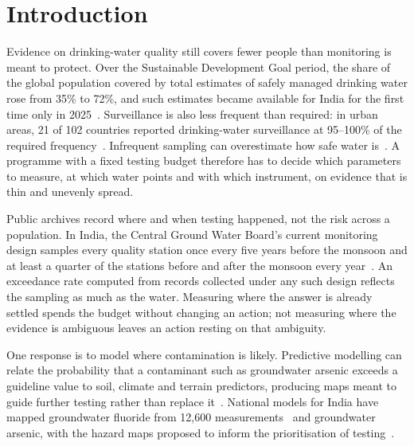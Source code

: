 \documentclass[10pt,letterpaper]{article}
\begin{document}
\clearpage
{}
\fancyhfoffset[L]{0pt}
\linenumbers

\FloatBarrier

\section*{Introduction}

Evidence on drinking-water quality still covers fewer people than monitoring is meant to protect. Over the Sustainable Development Goal period, the share of the global population covered by total estimates of safely managed drinking water rose from 35\% to 72\%, and such estimates became available for India for the first time only in 2025~\cite{JMP2025}. Surveillance is also less frequent than required: in urban areas, 21 of 102 countries reported drinking-water surveillance at 95--100\% of the required frequency~\cite{GLAAS2025}. Infrequent sampling can overestimate how safe water is~\cite{Bain2014}. A programme with a fixed testing budget therefore has to decide which parameters to measure, at which water points and with which instrument, on evidence that is thin and unevenly spread.

Public archives record where and when testing happened, not the risk across a population. In India, the Central Ground Water Board's current monitoring design samples every quality station once every five years before the monsoon and at least a quarter of the stations before and after the monsoon every year~\cite{CGWB-SOP-GWQDataAnalysis}. An exceedance rate computed from records collected under any such design reflects the sampling as much as the water. Measuring where the answer is already settled spends the budget without changing an action; not measuring where the evidence is ambiguous leaves an action resting on that ambiguity.

One response is to model where contamination is likely. Predictive modelling can relate the probability that a contaminant such as groundwater arsenic exceeds a guideline value to soil, climate and terrain predictors, producing maps meant to guide further testing rather than replace it~\cite{Podgorski2020}. National models for India have mapped groundwater fluoride from 12,600 measurements~\cite{Podgorski2018} and groundwater arsenic, with the hazard maps proposed to inform the prioritisation of testing~\cite{Podgorski2020-IJERPH-India}.
\end{document}
